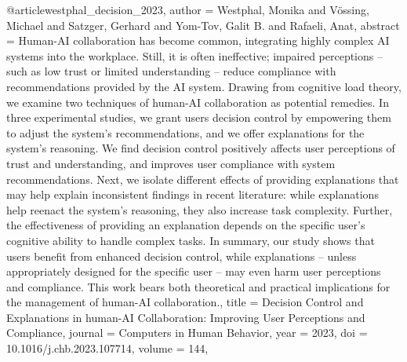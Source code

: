 @article{westphal_decision_2023,
  author = {Westphal, Monika and Vössing, Michael and Satzger, Gerhard and Yom-Tov, Galit B. and Rafaeli, Anat},
  abstract = {Human-AI collaboration has become common, integrating highly complex AI systems into the workplace. Still, it is often ineffective; impaired perceptions – such as low trust or limited understanding – reduce compliance with recommendations provided by the AI system. Drawing from cognitive load theory, we examine two techniques of human-AI collaboration as potential remedies. In three experimental studies, we grant users decision control by empowering them to adjust the system's recommendations, and we offer explanations for the system's reasoning. We find decision control positively affects user perceptions of trust and understanding, and improves user compliance with system recommendations. Next, we isolate different effects of providing explanations that may help explain inconsistent findings in recent literature: while explanations help reenact the system's reasoning, they also increase task complexity. Further, the effectiveness of providing an explanation depends on the specific user's cognitive ability to handle complex tasks. In summary, our study shows that users benefit from enhanced decision control, while explanations – unless appropriately designed for the specific user – may even harm user perceptions and compliance. This work bears both theoretical and practical implications for the management of human-AI collaboration.},
  title = {{Decision} {Control} {and} {Explanations} {in} {human-AI} {Collaboration}: {Improving} {User} {Perceptions} {and} {Compliance}},
  journal = {Computers in Human Behavior},
  year = {2023},
  doi = {10.1016/j.chb.2023.107714},
  volume = {144},
}

